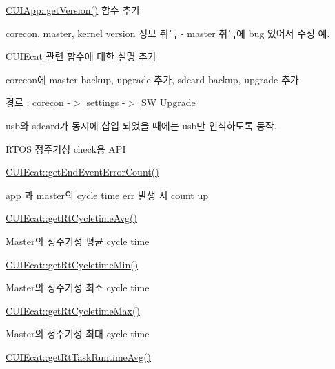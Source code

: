 \begin{DoxyEnumerate}
\item \hyperlink{classCUIApp_a6c61ac6cf4cf719bad5459bbefc37659}{C\-U\-I\-App\-::get\-Version()} 함수 추가
\begin{DoxyItemize}
\item corecon, master, kernel version 정보 취득 -\/ master 취득에 bug 있어서 수정 예.
\end{DoxyItemize}
\item \hyperlink{classCUIEcat}{C\-U\-I\-Ecat} 관련 함수에 대한 설명 추가
\item corecon에 master backup, upgrade 추가, sdcard backup, upgrade 추가
\begin{DoxyItemize}
\item 경로 \-: corecon -\/$>$ settings -\/$>$ S\-W Upgrade
\item usb와 sdcard가 동시에 삽입 되었을 때에는 usb만 인식하도록 동작.
\end{DoxyItemize}
\item R\-T\-O\-S 정주기성 check용 A\-P\-I
\begin{DoxyItemize}
\item \hyperlink{classCUIEcat_a49fba779055b9959e804b3d6587f9799}{C\-U\-I\-Ecat\-::get\-End\-Event\-Error\-Count()}
\begin{DoxyItemize}
\item app 과 master의 cycle time err 발생 시 count up
\end{DoxyItemize}
\item \hyperlink{classCUIEcat_ab62988589c529181b1b9716910d6e66a}{C\-U\-I\-Ecat\-::get\-Rt\-Cycletime\-Avg()}
\begin{DoxyItemize}
\item Master의 정주기성 평균 cycle time
\end{DoxyItemize}
\item \hyperlink{classCUIEcat_aee10d1bfa0042f7f7eed3fb799353643}{C\-U\-I\-Ecat\-::get\-Rt\-Cycletime\-Min()}
\begin{DoxyItemize}
\item Master의 정주기성 최소 cycle time
\end{DoxyItemize}
\item \hyperlink{classCUIEcat_af6d43ab5430d66093cec76234055baa7}{C\-U\-I\-Ecat\-::get\-Rt\-Cycletime\-Max()}
\begin{DoxyItemize}
\item Master의 정주기성 최대 cycle time
\end{DoxyItemize}
\item \hyperlink{classCUIEcat_adeb5b823fd182c274bcac03a9cfae560}{C\-U\-I\-Ecat\-::get\-Rt\-Task\-Runtime\-Avg()}

\end{DoxyItemize}
\end{DoxyEnumerate}
